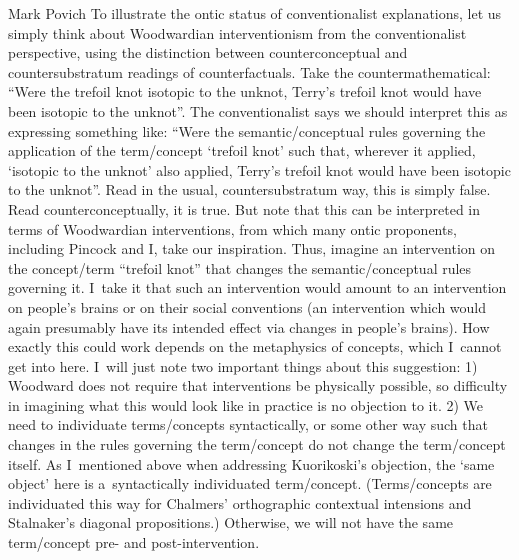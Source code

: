 \begin{artengenv}{Mark Povich}
To illustrate the ontic status of conventionalist explanations, let us simply think about Woodwardian
\parencite*[][]{woodward_making_2003} %
 interventionism from the conventionalist perspective, using the distinction between counterconceptual and countersubstratum readings of counterfactuals. Take the countermathematical: ``Were the trefoil knot isotopic to the unknot, Terry's trefoil knot would have been isotopic to the unknot''. The conventionalist says we should interpret this as expressing something like: ``Were the semantic/conceptual rules governing the application of the term/concept ‘trefoil knot' such that, wherever it applied, ‘isotopic to the unknot' also applied, Terry's trefoil knot would have been isotopic to the unknot''. Read in the usual, countersubstratum way, this is simply false. Read counterconceptually, it is true. But note that this can be interpreted in terms of Woodwardian interventions, from which many ontic proponents, including Pincock and I, take our inspiration. Thus, imagine an intervention on the concept/term ``trefoil knot'' that changes the semantic/conceptual rules governing it. I~take it that such an intervention would amount to an intervention on people's brains or on their social conventions (an intervention which would again presumably have its intended effect via changes in people's brains). How exactly this could work depends on the metaphysics of concepts, which I~cannot get into here. I~will just note two important things about this suggestion: 1) Woodward does not require that interventions be physically possible, so difficulty in imagining what this would look like in practice is no objection to it. 2) We need to individuate terms/concepts syntactically, or some other way such that changes in the rules governing the term/concept do not change the term/concept itself. As I~mentioned above when addressing Kuorikoski's objection, the ‘same object' here is a~syntactically individuated term/concept. (Terms/concepts are individuated this way for Chalmers' 
\parencite*[][pp.169–170]{chalmers_epistemic_2004} %
 orthographic contextual intensions and Stalnaker's 
\parencites*[][]{stalnaker_assertion_1978}[][]{stalnaker_considering_2001} %
 diagonal propositions.) Otherwise, we will not have the same term/concept pre- and post-intervention.


\end{artengenv}
